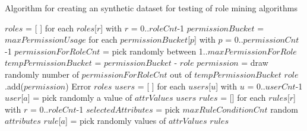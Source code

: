 \begin{algorithm}
\caption{Algorithm for creating an synthetic dataset for testing of role mining algorithms}
\label{alg:CreateDataSet}
\begin{algorithmic}[1]
    \State $roles$ = [ ] for each $roles$[$r$] with $r$ = 0..$roleCnt$-1
    \State $permissionBucket$ = $maxPermissionUsage$ for each $permissionBucket$[$p$] with $p$ = 0..$permissionCnt$-1
        \State $permissionForRoleCnt$ = pick randomly between 1..$maxPermissionForRole$
        \State $tempPermissionBucket$ = $permissionBucket$ - $role$
            \State $permission$ = draw randomly number of $permissionForRoleCnt$ out of $tempPermissionBucket$
            \State $role$.add($permission$)
        \Else
            \State Error
        \EndIf
    \EndFor
    \State \Return $roles$
\EndProcedure
\State
{}
    \State $users$ = [ ] for each $users$[$u$] with $u$ = 0..$userCnt$-1
            \State $user$[$a$] = pick randomly a value of $attrValues$
        \EndFor
    \EndFor
    \State \Return $users$
\EndProcedure
\State
{}
    \State $rules$ = [{}] for each $rules$[$r$] with $r$ = 0..$roleCnt$-1
        \State $selectedAttributes$ = pick $maxRuleConditionCnt$ random $attributes$
            \State $rule$[$a$] = pick randomly values of $attrValues$
        \EndFor
    \EndFor
    \State \Return $rules$
\EndProcedure
\end{algorithmic}
\end{algorithm}

